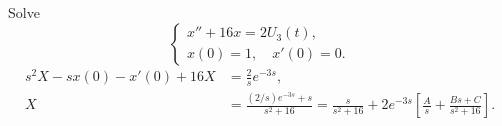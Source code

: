 \begin{example}
  Solve
  \[
    \begin{cases}
      x''+16x=2U_3(t), \\ x(0)=1,\quad x'(0)=0.
    \end{cases}
  \]
  \begin{align*}
    s^2X-sx(0)-x'(0)+16X & =\frac2s e^{-3s},              \\
    X                    & =\frac{(2/s)e^{-3s}+s}{s^2+16}
    =\frac{s}{s^2+16}+2e^{-3s}\left[\frac As+\frac{Bs+C}{s^2+16}\right].
  \end{align*}
\end{example}
